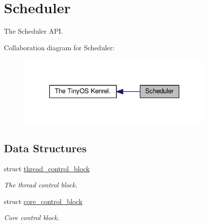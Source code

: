 \hypertarget{group__scheduler}{\section{Scheduler}
\label{group__scheduler}
}


The Scheduler A\-P\-I.  


Collaboration diagram for Scheduler\-:
\nopagebreak
\begin{figure}[H]
\begin{center}
\leavevmode
\includegraphics[width=280pt]{group__scheduler}
\end{center}
\end{figure}
\subsection*{Data Structures}
\begin{DoxyCompactItemize}
\item 
struct \hyperlink{structthread__control__block}{thread\-\_\-control\-\_\-block}
\begin{DoxyCompactList}\small\item\em The thread control block. \end{DoxyCompactList}\item 
struct \hyperlink{structcore__control__block}{core\-\_\-control\-\_\-block}
\begin{DoxyCompactList}\small\item\em Core control block. \end{DoxyCompactList}\end{DoxyCompactItemize}
